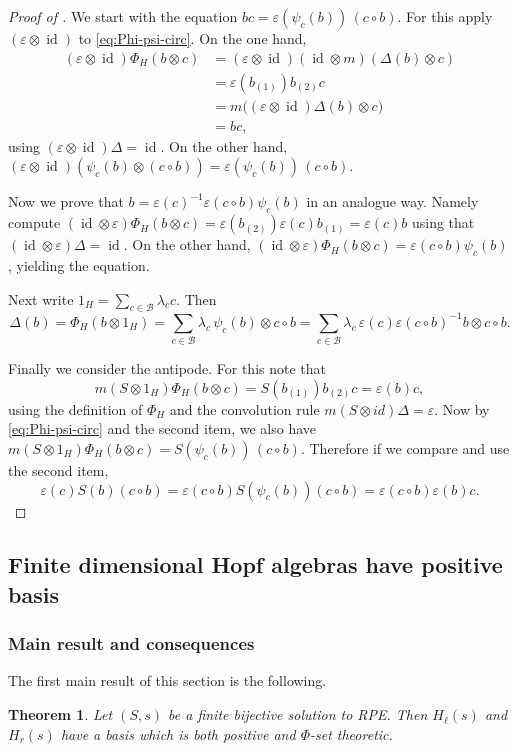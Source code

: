 \documentclass[a4paper,10pt]{amsart}
\newtheorem{theorem}[lemma]{Theorem}
\theoremstyle{definition}
\theoremstyle{remark}
\DeclareMathOperator{\id}{id}
\newcommand\D{\Delta}
\newcommand\eps{\varepsilon}
\newcommand\ot{\otimes}
\newcommand\mc{\mathcal}
\begin{document}
\begin{proof}[Proof of ]
We start with the equation $bc = \eps(\psi_c(b))\,(c\circ b)$. For this apply $(\eps\otimes \id)$ to \eqref{eq:Phi-psi-circ}. On the one hand,
\begin{align*}
(\eps\ot \id)\Phi_H(b\ot c)
 & = (\eps\ot \id)(\id\ot m)(\D(b)\ot c) \\
 & = \eps(b_{(1)}) b_{(2)}c \\
&= m\bigl((\eps\ot \id)\D(b)\ot c\bigr)\\
&= bc,
\end{align*} 
using $(\eps\ot \id)\D=\id$.
On the other hand, $(\eps\ot \id)(\psi_c(b)\ot (c\circ b))=\eps(\psi_c(b))\,(c\circ b).$

Now we prove that $b= \eps(c)^{-1}\eps(c \circ b)\psi_c(b)$ in an analogue way. Namely compute $(\id \ot \eps)\Phi_H(b\ot c) = \eps(b_{(2)})\eps(c)b_{(1)}= \eps(c) b$ using that $(\id \ot \eps)\D = \id.$ On the other hand, $(\id \ot \eps)\Phi_H(b\ot c) = \eps(c \circ b) \psi_c(b)$, yielding the equation. \medskip

Next write $1_H = \sum_{c \in \mc{B}} \lambda_c c$. Then 
$$\D(b) = \Phi_H(b\ot 1_H) = \sum_{c \in \mc{B}} \lambda_c \,\psi_c(b)\otimes c\circ b = \sum_{c \in \mc{B}} \lambda_c \, \eps(c)\eps(c \circ b)^{-1}b \ot c \circ b.$$

Finally we consider the antipode. For this note that 
$$m(S \ot 1_H)\Phi_H(b \ot c) = S(b_{(1)})b_{(2)}c = \eps(b)c,$$ 
using the definition of $\Phi_H$ and the convolution rule $m(S\ot id)\D= \eps$. Now by \eqref{eq:Phi-psi-circ} and the second item, we also have $m(S \ot 1_H)\Phi_H(b \ot c)= S(\psi_c(b))\, (c \circ b).$ Therefore if we compare and use the second item,
$$\eps(c) S(b) (c\circ b) =  \eps(c\circ b) S(\psi_c(b)) (c\circ b) = \eps(c\circ b) \eps( b) c.$$
\end{proof}

\subsection{Finite dimensional Hopf algebras have positive basis}

\subsubsection{Main result and consequences}

The first main result of this section is the following.
\begin{theorem}\label{pos basis prop theorem}
Let $(S,s)$ be a finite bijective solution to RPE. Then $H_{\ell}(s)$ and $H_{r}(s)$ have a basis which is both positive and $\Phi$-set theoretic.
\end{theorem}
\end{document}
